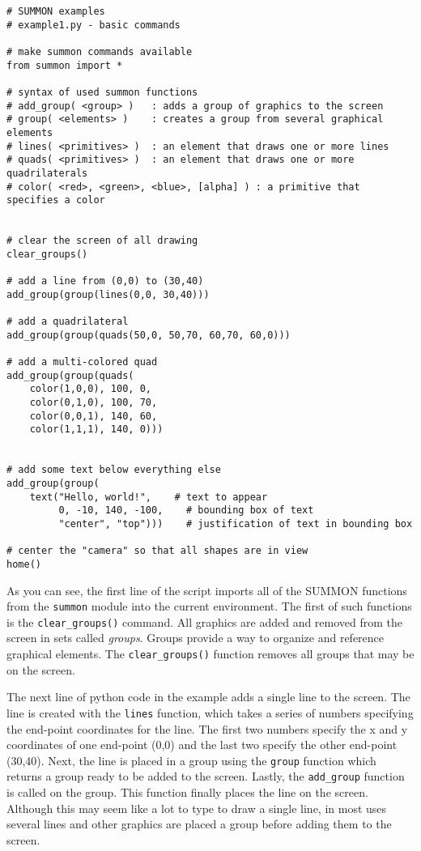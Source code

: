 \documentclass[12pt]{article}
\newcommand{\code}[1]{{\tt #1}}
\begin{document}
\begin{minipage}{6in}
{ \footnotesize
\begin{verbatim}
# SUMMON examples
# example1.py - basic commands

# make summon commands available
from summon import *

# syntax of used summon functions
# add_group( <group> )   : adds a group of graphics to the screen
# group( <elements> )    : creates a group from several graphical elements
# lines( <primitives> )  : an element that draws one or more lines
# quads( <primitives> )  : an element that draws one or more quadrilaterals
# color( <red>, <green>, <blue>, [alpha] ) : a primitive that specifies a color


# clear the screen of all drawing
clear_groups()

# add a line from (0,0) to (30,40)
add_group(group(lines(0,0, 30,40)))

# add a quadrilateral
add_group(group(quads(50,0, 50,70, 60,70, 60,0)))

# add a multi-colored quad
add_group(group(quads(
    color(1,0,0), 100, 0,
    color(0,1,0), 100, 70,
    color(0,0,1), 140, 60,
    color(1,1,1), 140, 0)))


# add some text below everything else
add_group(group(
    text("Hello, world!",    # text to appear
         0, -10, 140, -100,    # bounding box of text
         "center", "top")))    # justification of text in bounding box

# center the "camera" so that all shapes are in view
home()
\end{verbatim}
}
\end{minipage}
\vspace{.25in}


As you can see, the first line of the script imports all of the SUMMON functions
from the \code{summon} module into the current environment.  The first of such
functions is the \code{clear\_groups()} command.  All graphics are added and
removed from the screen in sets called {\em groups}.  Groups provide a way to
organize and reference graphical elements.  The \code{clear\_groups()} function
removes all groups that may be on the screen.

The next line of python code in the example adds a single line to the screen. 
The line is created with the \code{lines} function, which takes a series of
numbers specifying the end-point coordinates for the line.  The first
two numbers specify the x and y coordinates of one end-point (0,0) and the last
two specify the other end-point (30,40).  Next, the line is placed in a group
using the \code{group} function which returns a group ready to be added to the
screen.   Lastly, the \code{add\_group} function is called on the group.  This
function finally places the line on the screen.  Although this may seem like a
lot to type to draw a single line, in most uses several lines and other graphics 
are placed a group before adding them to the screen.
\end{document}
